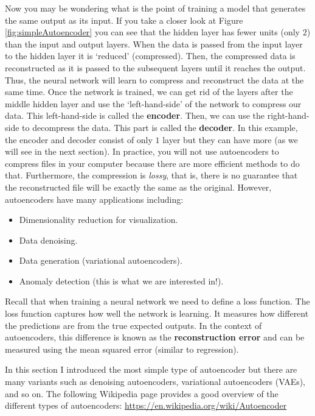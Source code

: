 \documentclass[
  11pt,
]{krantz}
\makeatletter
\providecommand{\tightlist}{%
  \setlength{\itemsep}{0pt}\setlength{\parskip}{0pt}}
\newenvironment{kframe}{%
\medskip{}
\setlength{\fboxsep}{.8em}
 \def\at@end@of@kframe{}%
 \ifinner\ifhmode%
  \def\at@end@of@kframe{\end{minipage}}%
  \begin{minipage}{\columnwidth}%
 \fi\fi%
 \def\FrameCommand##1{\hskip\@totalleftmargin \hskip-\fboxsep
 \colorbox{shadecolor}{##1}\hskip-\fboxsep
     \hskip-\linewidth \hskip-\@totalleftmargin \hskip\columnwidth}%
 \MakeFramed {\advance\hsize-\width
   \@totalleftmargin\z@ \linewidth\hsize
   \@setminipage}}%
 {\par\unskip\endMakeFramed%
 \at@end@of@kframe}
\newenvironment{rmdblock}[1]
  {
  \begin{itemize}
  \renewcommand{\labelitemi}{
    \raisebox{-.7\height}[0pt][0pt]{
      {\setkeys{Gin}{width=3em,keepaspectratio}\texttt{[image: images/icons/\#1]}}
    }
  }
  \setlength{\fboxsep}{1em}
  \begin{kframe}
  \item
  }
  {
  \end{kframe}
  \end{itemize}
  }
\newenvironment{rmdinfo}
  {\begin{rmdblock}{info}}
  {\end{rmdblock}}
\makeatother
\begin{document}
Now you may be wondering what is the point of training a model that generates the same output as its input. If you take a closer look at Figure \ref{fig:simpleAutoencoder} you can see that the hidden layer has fewer units (only \(2\)) than the input and output layers. When the data is passed from the input layer to the hidden layer it is `reduced' (compressed). Then, the compressed data is reconstructed as it is passed to the subsequent layers until it reaches the output. Thus, the neural network will learn to compress and reconstruct the data at the same time. Once the network is trained, we can get rid of the layers after the middle hidden layer and use the `left-hand-side' of the network to compress our data. This left-hand-side is called the \textbf{encoder}. Then, we can use the right-hand-side to decompress the data. This part is called the \textbf{decoder}. In this example, the encoder and decoder consist of only \(1\) layer but they can have more (as we will see in the next section). In practice, you will not use autoencoders to compress files in your computer because there are more efficient methods to do that. Furthermore, the compression is \emph{lossy}, that is, there is no guarantee that the reconstructed file will be exactly the same as the original. However, autoencoders have many applications including:

\begin{itemize}
\tightlist
\item
  Dimensionality reduction for visualization.
\item
  Data denoising.
\item
  Data generation (variational autoencoders).
\item
  Anomaly detection (this is what we are interested in!).
\end{itemize}

Recall that when training a neural network we need to define a loss function. The loss function captures how well the network is learning. It measures how different the predictions are from the true expected outputs. In the context of autoencoders, this difference is known as the \textbf{reconstruction error} and can be measured using the mean squared error (similar to regression).

\begin{rmdinfo}
In this section I introduced the most simple type of autoencoder but there are many variants such as denoising autoencoders, variational autoencoders (VAEs), and so on. The following Wikipedia page provides a good overview of the different types of autoencoders: \url{https://en.wikipedia.org/wiki/Autoencoder}
\end{rmdinfo}
\end{document}
